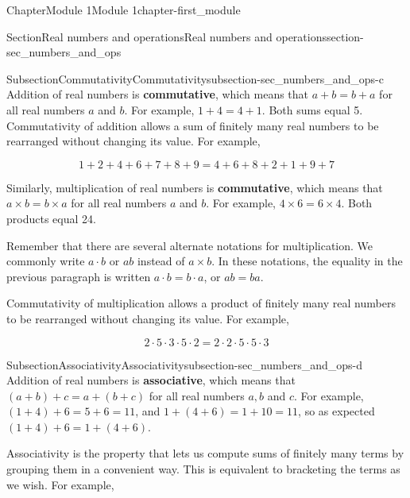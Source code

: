 \documentclass[oneside,10pt,]{book}
\newcommand{\terminology}[1]{\textbf{#1}}
\begin{document}
\begin{chapterptx}{Chapter}{Module 1}{}{Module 1}{}{}{chapter-first_module}
\begin{sectionptx}{Section}{Real numbers and operations}{}{Real numbers and operations}{}{}{section-sec_numbers_and_ops}
\typeout{************************************************}
%
\begin{subsectionptx}{Subsection}{Commutativity}{}{Commutativity}{}{}{subsection-sec_numbers_and_ops-c}
Addition of real numbers is \terminology{commutative}, which means that \(a + b = b + a\) for all real numbers \(a\) and \(b\).  For example, \(1+4 = 4+1\).  Both sums equal 5.  Commutativity of addition allows a sum of finitely many real numbers to be rearranged without changing its value. For example,%
\par
%
\begin{equation*}
1 + 2 + 4 + 6 + 7 + 8 + 9 = 4 + 6 + 8 + 2 + 1 + 9 + 7
\end{equation*}
%
\par
Similarly, multiplication of real numbers is \terminology{commutative}, which means that \(a \times b = b \times a\) for all real numbers \(a\) and \(b\).  For example, \(4 \times 6 = 6 \times 4\).  Both products equal 24.%
\par
Remember that there are several alternate notations for multiplication.  We commonly write \(a \cdot b\) or \(ab\) instead of \(a \times b\).  In these notations, the equality in the previous paragraph is written \(a \cdot b = b \cdot a\), or \(ab=ba\).%
\par
Commutativity of multiplication allows a product of finitely many real numbers to be rearranged without changing its value.  For example,%
\par
%
\begin{equation*}
2 \cdot 5 \cdot 3 \cdot 5 \cdot 2 = 2 \cdot 2 \cdot 5 \cdot 5 \cdot 3
\end{equation*}
%
\end{subsectionptx}
%
%
\typeout{************************************************}
\typeout{************************************************}
%
\begin{subsectionptx}{Subsection}{Associativity}{}{Associativity}{}{}{subsection-sec_numbers_and_ops-d}
Addition of real numbers is \terminology{associative}, which means that \((a+b)+c = a + (b+c)\) for all real numbers \(a, b\) and \(c\). For example, \((1+4) + 6 = 5+6 = 11\), and \(1+(4+6) = 1+10 = 11\), so as expected \((1+4)+6 = 1 + (4+6)\).%
\par
Associativity is the property that lets us compute sums of finitely many terms by grouping them in a convenient way.  This is equivalent to bracketing the terms as we wish.  For example,%

\end{subsectionptx}
\end{sectionptx}
\end{chapterptx}
\end{document}
